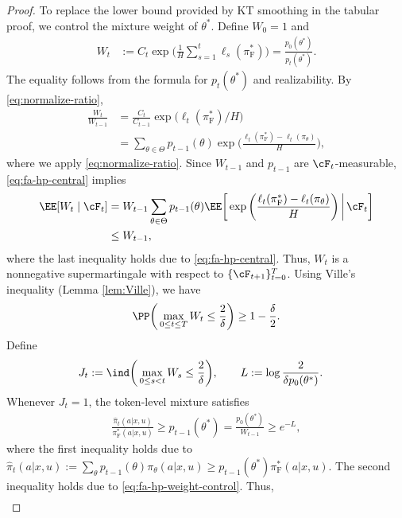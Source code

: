 \documentclass[11pt]{article}
\newcommand{\pif}{\pi_{\mathrm{F}}}
\begin{document}
\begin{proof}
To replace the lower bound provided by KT smoothing in the
tabular proof, we control the mixture weight of $\theta^*$.
Define $W_0=1$ and
\begin{align*}
    W_t
    &:=
    C_t\exp\bigg(
        \frac1H\sum_{s=1}^t\ell_s(\pif^*)
    \bigg)
    =
    \frac{p_0(\theta^*)}{p_t(\theta^*)}.
\end{align*}
The equality follows from the formula for $p_t(\theta^*)$
and realizability. By \eqref{eq:normalize-ratio},
\begin{align*}
    \frac{W_t}{W_{t-1}}
    &=
    \frac{C_t}{C_{t-1}}
    \exp\bigl(\ell_t(\pif^*)/H\bigr)\\
    &=
    \sum_{\theta\in\Theta}
    p_{t-1}(\theta)
    \exp\bigg(
        \frac{\ell_t(\pif^*)-\ell_t(\pi_\theta)}H
    \bigg),
\end{align*}
where we apply \eqref{eq:normalize-ratio}. 
Since $W_{t-1}$ and $p_{t-1}$ are $\cF_t$-measurable,
\eqref{eq:fa-hp-central} implies
\begin{align*}
    \EE[W_t\mid\cF_t]
    &=
    W_{t-1}\sum_{\theta\in\Theta}
    p_{t-1}(\theta)
    \EE\bigg[
        \exp\bigg(
            \frac{\ell_t(\pif^*)-\ell_t(\pi_\theta)}H
        \bigg)
        \,\bigg|\,\cF_t
    \bigg]\\
    &\leq W_{t-1},
\end{align*}
where the last inequality holds due to \eqref{eq:fa-hp-central}. Thus, $W_t$ is a nonnegative supermartingale with respect
to $\{\cF_{t+1}\}_{t=0}^T$. Using Ville's inequality (Lemma \ref{lem:Ville}), we have
\begin{align}
    \PP\bigg(
        \max_{0\leq t\leq T}W_t\leq\frac2\delta
    \bigg)
    \geq1-\frac\delta2.
    \label{eq:fa-hp-weight-control}
\end{align}
Define
\begin{align*}
    J_t
    &:=
    \ind\bigg(
        \max_{0\leq s<t}W_s\leq\frac2\delta
    \bigg),
    \qquad
    L:=\log\frac{2}{\delta p_0(\theta^*)}.
\end{align*}
Whenever $J_t=1$, the token-level mixture satisfies
\begin{align*}
    \frac{\hat\pi_t(a|x,u)}{\pif^*(a|x,u)}
    \geq
    p_{t-1}(\theta^*)
    =
    \frac{p_0(\theta^*)}{W_{t-1}}
    \geq e^{-L},
\end{align*}
where the first inequality holds due to $\hat \pi_t(a|x,u):= \sum_{\theta} p_{t-1}(\theta) \pi_{\theta}(a|x,u) \ge p_{t-1}(\theta^*) \pif^*(a|x,u)$. The second inequality holds due to \eqref{eq:fa-hp-weight-control}. Thus,
\begin{align*}

\end{align*}
\end{proof}
\end{document}
